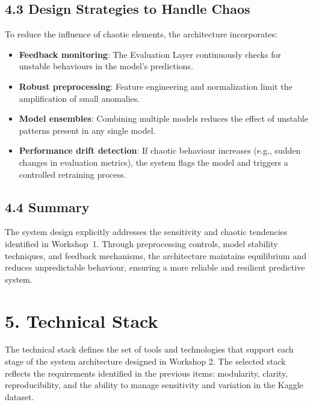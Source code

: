 \documentclass[12pt]{report}
\begin{document}
\subsection*{4.3 Design Strategies to Handle Chaos}

To reduce the influence of chaotic elements, the architecture incorporates:

\begin{itemize}
    \item \textbf{Feedback monitoring}: The Evaluation Layer continuously checks for 
    unstable behaviours in the model's predictions.
    
    \item \textbf{Robust preprocessing}: Feature engineering and normalization limit the 
    amplification of small anomalies.

    \item \textbf{Model ensembles}: Combining multiple models reduces the effect of 
    unstable patterns present in any single model.

    \item \textbf{Performance drift detection}: If chaotic behaviour increases 
    (e.g., sudden changes in evaluation metrics), the system flags the model and 
    triggers a controlled retraining process.
\end{itemize}

\subsection*{4.4 Summary}

The system design explicitly addresses the sensitivity and chaotic tendencies identified 
in Workshop~1. Through preprocessing controls, model stability techniques, and feedback 
mechanisms, the architecture maintains equilibrium and reduces unpredictable behaviour, 
ensuring a more reliable and resilient predictive system.



\section*{5. Technical Stack}

The technical stack defines the set of tools and technologies that support each stage 
of the system architecture designed in Workshop 2. The selected stack reflects the 
requirements identified in the previous items: modularity, clarity, reproducibility, and 
the ability to manage sensitivity and variation in the Kaggle dataset.
\end{document}
